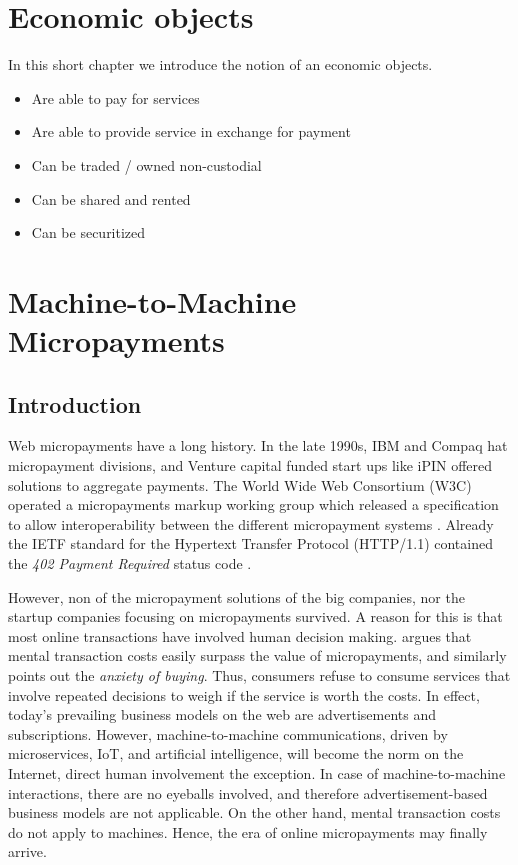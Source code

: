 \chapter{Economic objects}

In this short chapter we introduce the notion of an economic objects. 

\begin{itemize}
\item Are able to pay for services
\item Are able to provide service in exchange for payment
\item Can be traded / owned non-custodial
\item Can be shared and rented
\item Can be securitized
\end{itemize}




\chapter{Machine-to-Machine Micropayments}
\label{sec:m2m}

\section{Introduction}

Web micropayments have a long history. In the late 1990s, IBM and Compaq hat micropayment divisions, and Venture capital funded start ups like iPIN offered solutions to aggregate payments. The World Wide Web Consortium (W3C) operated a micropayments markup working group which released a specification to allow interoperability between the different micropayment systems \parencite{w3c1999}. Already the IETF standard for the Hypertext Transfer Protocol (HTTP/1.1) contained the \emph{402 Payment Required} status code \parencite{fielding1999hypertext}.

However, non of the micropayment solutions of the big companies, nor the startup companies focusing on micropayments survived. A reason for this is that most online transactions have involved human decision making. \cite{szabo1999micropayments} argues that mental transaction costs easily surpass the value of micropayments, and similarly \cite{shirky2000} points out the \emph{anxiety of buying}. Thus, consumers refuse to consume services that involve repeated decisions to weigh if the service is worth the costs. In effect, today's prevailing business models on the web are advertisements and subscriptions. However, machine-to-machine communications, driven by microservices, IoT, and artificial intelligence, will become the norm on the Internet, direct human involvement the exception. In case of machine-to-machine interactions, there are no eyeballs involved, and therefore advertisement-based business models are not applicable. On the other hand, mental transaction costs do not apply to machines. Hence, the era of online micropayments may finally arrive.

